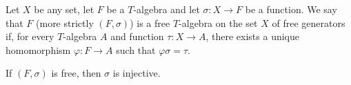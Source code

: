 Let $X$ be any set, let $F$ be a $T$-algebra and let $\sigma: X \to F$ be a function. We say that $F$ (more strictly $(F, \sigma)$) is a free $T$-algebra on the set $X$ of free generators if, for every $T$-algebra $A$ and function $\tau: X \to A$, there exists a unique homomorphism $\varphi: F \to A$ such that $\varphi\sigma = \tau$.

If $(F, \sigma)$ is free, then $\sigma$ is injective.
